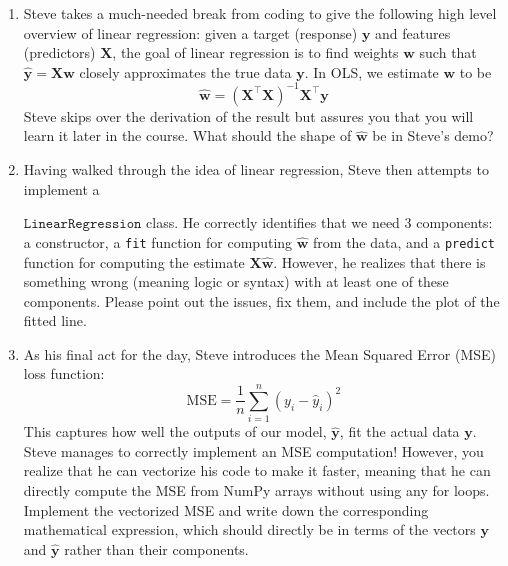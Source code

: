\documentclass{../harvardml}
\theoremstyle{definition}
\theoremstyle{plain}
\begin{document}
\begin{problem} 
\begin{enumerate}
    \item Steve takes a much-needed break from coding to give the following high level overview of linear regression: given a target (response) $\bm y$ and features (predictors) $\bm X$, the goal of linear regression is to find weights $\bm w$ such that $\bm{\hat y} = \bm X \bm w$ closely approximates the true data $\bm y$. In OLS, we estimate $\bm w$ to be
    \[\bm{\hat w} = (\bm X^\top \bm X)^{-1}\bm X^\top \bm y\]
    Steve skips over the derivation of the result but assures you that you will learn it later in the course. What should the shape of $\bm{\hat w}$ be in Steve's demo?

    \item Having walked through the idea of linear regression, Steve then attempts to implement a 
    
    $\texttt{LinearRegression}$ class. He correctly identifies that we need 3 components: a constructor, a \texttt{fit} function for computing $\hat{\bm w}$ from the data, and a \texttt{predict} function for computing the estimate $\bm X \hat{\bm w}$. However, he realizes that there is something wrong (meaning logic or syntax) with at least one of these components. Please point out the issues, fix them, and include the plot of the fitted line.

    \item As his final act for the day, Steve introduces the Mean Squared Error (MSE) loss function:
    \[\text{MSE} = \frac{1}{n}\sum_{i=1}^{n}(y_i - \hat y_i)^2\]
    This captures how well the outputs of our model, $\bm{\hat y}$, fit the actual data $\bm y$. Steve manages to correctly implement an MSE computation! However, you realize that he can vectorize his code to make it faster, meaning that he can directly compute the MSE from NumPy arrays without using any for loops. Implement the vectorized MSE and write down the corresponding mathematical expression, which should directly be in terms of the vectors $\bm y$ and $\hat{\bm y}$ rather than their components.
    
\end{enumerate}

\end{problem}
\end{document}
